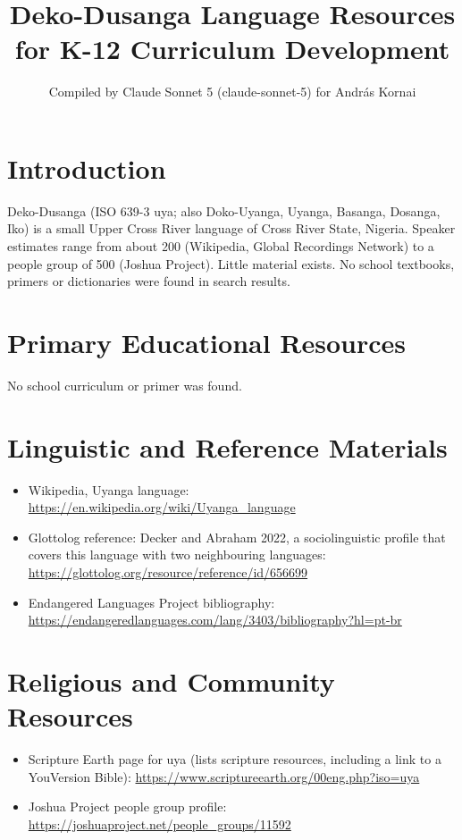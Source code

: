 \documentclass[12pt]{article}
\title{Deko-Dusanga Language Resources for K-12 Curriculum Development}
\author{Compiled by Claude Sonnet 5 (claude-sonnet-5) for Andr\'as Kornai}
\date{}
\begin{document}
\maketitle

\section{Introduction}
Deko-Dusanga (ISO 639-3 uya; also Doko-Uyanga, Uyanga, Basanga, Dosanga, Iko) is a small Upper Cross River language of Cross River State, Nigeria. Speaker estimates range from about 200 (Wikipedia, Global Recordings Network) to a people group of 500 (Joshua Project). Little material exists. No school textbooks, primers or dictionaries were found in search results.

\section{Primary Educational Resources}
No school curriculum or primer was found.

\section{Linguistic and Reference Materials}
\begin{itemize}
\item Wikipedia, Uyanga language: \url{https://en.wikipedia.org/wiki/Uyanga_language}
\item Glottolog reference: Decker and Abraham 2022, a sociolinguistic profile that covers this language with two neighbouring languages: \url{https://glottolog.org/resource/reference/id/656699}
\item Endangered Languages Project bibliography: \url{https://endangeredlanguages.com/lang/3403/bibliography?hl=pt-br}
\end{itemize}

\section{Religious and Community Resources}
\begin{itemize}
\item Scripture Earth page for uya (lists scripture resources, including a link to a YouVersion Bible): \url{https://www.scriptureearth.org/00eng.php?iso=uya}
\item Joshua Project people group profile: \url{https://joshuaproject.net/people_groups/11592}
\end{itemize}
\end{document}
